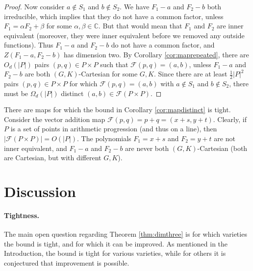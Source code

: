 \documentclass{daj}
\theoremstyle{definition}
\newcommand{\C}{\mathbb C}
\begin{document}
\begin{proof}
Now consider $a\not\in S_1$ and $b\not\in S_2$.
We have $F_1-a$ and $F_2-b$ both irreducible, which implies that they do not have a common factor, 
unless $F_1 = \alpha F_2 + \beta$ for some $\alpha,\beta\in \C$.
But that would mean that $F_1$ and $F_2$ are inner equivalent (moreover, they were inner equivalent before we removed any outside functions).
Thus $F_1-a$ and $F_2-b$ do not have a common factor, and $Z(F_1-a,F_2-b)$ has dimension two.
By Corollary \ref{cor:maprepeated},
there are $O_d(|P|)$ pairs $(p,q)\in P\times P$ such that $\mathcal{F}(p,q) = (a,b)$, unless $F_1-a$ and $F_2-b$ are both $(G,K)$-Cartesian for some $G,K$.
Since there are at least $\frac{1}{2}|P|^2$ pairs $(p,q)\in P\times P$ for which $\mathcal{F}(p,q)=(a,b)$ with $a\not\in S_1$ and $b\not\in S_2$,
there must be $\Omega_d(|P|)$ distinct $(a,b)\in \mathcal{F}(P\times P)$.
\end{proof}

There are maps for which the bound in Corollary \ref{cor:mapdistinct} is tight.
Consider the vector addition map $\mathcal{F}(p,q) = p+ q = (x+s,y+t)$. 
Clearly, if $P$ is a set of points in arithmetic progression (and thus on a line), then $|\mathcal{F}(P\times P)| = O(|P|)$.
The polynomials $F_1 = x+s$ and $F_2 = y+t$ are not inner equivalent, and $F_1-a$ and $F_2-b$ are never both $(G,K)$-Cartesian (both are Cartesian, but with different $G,K$).




\section{Discussion}
\label{sec:discussion}


\paragraph{Tightness.}
The main open question regarding Theorem \ref{thm:dimthree} is for which varieties the bound is tight, and for which it can be improved.
As mentioned in the Introduction, the bound is tight for various varieties, while for others it is conjectured that improvement is possible.
\end{document}
